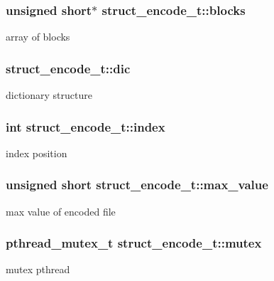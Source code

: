 \subsubsection[{blocks}]{\setlength{\rightskip}{0pt plus 5cm}unsigned short$\ast$ struct\+\_\+encode\+\_\+t\+::blocks}\label{structstruct__encode__t_a68cfa7f7999dd746c60f7c693fd913a5}
array of blocks \hypertarget{structstruct__encode__t_a06538986ddff38129ed59d264e52c454}{}
\subsubsection[{dic}]{ struct\+\_\+encode\+\_\+t\+::dic}\label{structstruct__encode__t_a06538986ddff38129ed59d264e52c454}
dictionary structure \hypertarget{structstruct__encode__t_a38cda024422106571aebeba0a930a57d}{}
\subsubsection[{index}]{\setlength{\rightskip}{0pt plus 5cm}int struct\+\_\+encode\+\_\+t\+::index}\label{structstruct__encode__t_a38cda024422106571aebeba0a930a57d}
index position \hypertarget{structstruct__encode__t_a71a25270ac52870def71fd78ba5f11b8}{}
\subsubsection[{max\+\_\+value}]{\setlength{\rightskip}{0pt plus 5cm}unsigned short struct\+\_\+encode\+\_\+t\+::max\+\_\+value}\label{structstruct__encode__t_a71a25270ac52870def71fd78ba5f11b8}
max value of encoded file \hypertarget{structstruct__encode__t_ab554df172d2a7022100a56e7061e3722}{}
\subsubsection[{mutex}]{\setlength{\rightskip}{0pt plus 5cm}pthread\+\_\+mutex\+\_\+t struct\+\_\+encode\+\_\+t\+::mutex}\label{structstruct__encode__t_ab554df172d2a7022100a56e7061e3722}
mutex pthread \hypertarget{structstruct__encode__t_abd97350bcc97312570121508eb4371aa}{}
